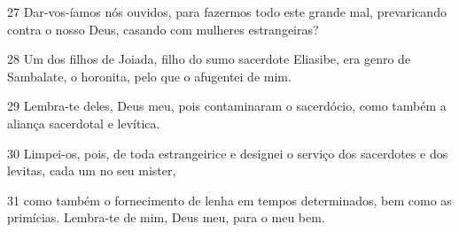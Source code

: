 \par 27 Dar-vos-íamos nós ouvidos, para fazermos todo este grande mal, prevaricando contra o nosso Deus, casando com mulheres estrangeiras?
\par 28 Um dos filhos de Joiada, filho do sumo sacerdote Eliasibe, era genro de Sambalate, o horonita, pelo que o afugentei de mim.
\par 29 Lembra-te deles, Deus meu, pois contaminaram o sacerdócio, como também a aliança sacerdotal e levítica.
\par 30 Limpei-os, pois, de toda estrangeirice e designei o serviço dos sacerdotes e dos levitas, cada um no seu mister,
\par 31 como também o fornecimento de lenha em tempos determinados, bem como as primícias. Lembra-te de mim, Deus meu, para o meu bem.


